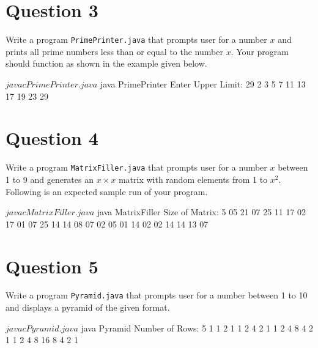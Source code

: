 \documentclass[12pt,letterpaper,twoside]{article}
\begin{document}
\section*{Question 3}

Write a program \texttt{PrimePrinter.java} that prompts user for a number $x$ and prints all prime numbers less than or equal to the number $x$.
Your program should function as shown in the example given below.

\begin{terminal}
$ javac PrimePrinter.java
$ java PrimePrinter
Enter Upper Limit: 29
2 3 5 7 11 13 17 19 23 29
\end{terminal}

\section*{Question 4}

Write a program \texttt{MatrixFiller.java} that prompts user for a number $x$ between 1 to 9 and generates an $x \times x$ matrix with random elements from 1 to $x^2$.
Following is an expected sample run of your program.

\begin{terminal}
$ javac MatrixFiller.java
$ java MatrixFiller
Size of Matrix: 5
 05 21 07 25 11
 17 02 17 01 07
 25 14 14 08 07
 02 05 01 14 02
 02 14 14 13 07
\end{terminal}

\newpage

\section*{Question 5}

Write a program \texttt{Pyramid.java} that prompts user for a number between 1 to 10 and displays a pyramid of the given format.

\begin{terminal}
$ javac Pyramid.java
$ java Pyramid
Number of Rows: 5
                   1
               1   2   1
           1   2   4   2   1
       1   2   4   8   4   2   1
   1   2   4   8  16   8   4   2   1
\end{terminal}

\end{document}
